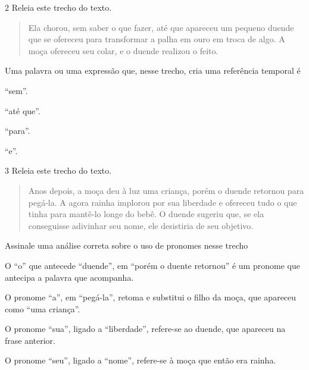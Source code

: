 
\pagebreak
\num{2} Releia este trecho do texto.

\begin{quote}
Ela chorou, sem saber o que fazer, até que apareceu um pequeno duende que se
ofereceu para transformar a palha em ouro em troca de algo. A moça
ofereceu seu colar, e o duende realizou o feito.
\end{quote}

Uma palavra ou uma expressão que, nesse trecho, cria uma referência temporal é

\begin{minipage}{.5\textwidth}
\begin{escolha}
\item “sem”.

\item “até que”.

\item “para”.

\item “e”.
\end{escolha}
\end{minipage}


\num{3} Releia este trecho do texto.

\begin{quote}
Anos depois, a moça deu à luz uma criança, porém o duende retornou para
pegá-la. A agora rainha implorou por sua liberdade e ofereceu tudo o que
tinha para mantê-lo longe do bebê. O duende sugeriu que, se ela
conseguisse adivinhar seu nome, ele desistiria de seu objetivo.
\end{quote}

Assinale uma análise correta sobre o uso de pronomes nesse trecho

\begin{escolha}
\item O “o” que antecede “duende”, em “porém o duente retornou” é um pronome que antecipa a palavra que acompanha.

\item O pronome “a”, em “pegá-la”, retoma e substitui o filho da moça, que apareceu como “uma criança”.

\item O pronome “sua”, ligado a “liberdade”, refere-se ao duende, que apareceu na frase anterior.

\item O pronome “seu”, ligado a “nome”, refere-se à moça que então era rainha.
\end{escolha}






